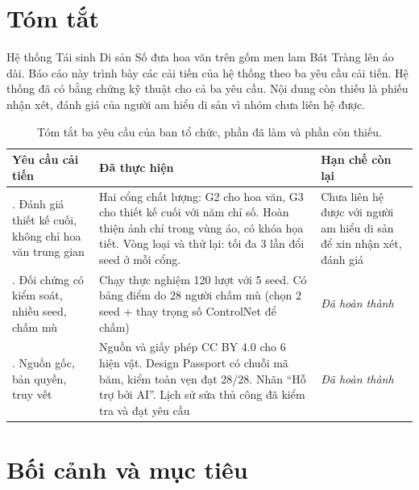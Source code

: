 \documentclass[12pt,a4paper]{report}
\begin{document}
\chapter*{Tóm tắt}

Hệ thống Tái sinh Di sản Số đưa hoa văn trên gốm men lam Bát Tràng lên áo dài. Báo cáo này trình bày các cải tiến của hệ thống theo ba yêu cầu cải tiến. Hệ thống đã có bằng chứng kỹ thuật cho cả ba yêu cầu. Nội dung còn thiếu là phiếu nhận xét, đánh giá của người am hiểu di sản vì nhóm chưa liên hệ được.

\begin{table}[H]
\centering
\setlength{\tabcolsep}{4pt}
\footnotesize
\caption{Tóm tắt ba yêu cầu của ban tổ chức, phần đã làm và phần còn thiếu.}
\label{tab:tomtat}
\begin{tabularx}{\textwidth}{>{\raggedright\arraybackslash}p{3.3cm}>{\raggedright\arraybackslash}X>{\raggedright\arraybackslash}p{4.2cm}}
\toprule
\textbf{Yêu cầu cải tiến} & \textbf{Đã thực hiện} & \textbf{Hạn chế còn lại} \\
\midrule
1. Đánh giá thiết kế cuối, không chỉ hoa văn trung gian &
Hai cổng chất lượng: G2 cho hoa văn, G3 cho thiết kế cuối với năm chỉ số. Hoàn thiện ảnh chỉ trong vùng áo, có khóa họa tiết. Vòng loại và thử lại: tối đa 3 lần đổi seed ở mỗi cổng. &
Chưa liên hệ được với người am hiểu di sản để xin nhận xét, đánh giá \\
\addlinespace
2. Đối chứng có kiểm soát, nhiều seed, chấm mù &
Chạy thực nghiệm 120 lượt với 5 seed. Có bảng điểm do 28 người chấm mù (chọn 2 seed + thay trọng số ControlNet để chấm) &
\textit{Đã hoàn thành} \\
\addlinespace
3. Nguồn gốc, bản quyền, truy vết &
Nguồn và giấy phép CC BY 4.0 cho 6 hiện vật. Design Passport có chuỗi mã băm, kiểm toàn vẹn đạt 28/28. Nhãn “Hỗ trợ bởi AI”. Lịch sử sửa thủ công đã kiểm tra và đạt yêu cầu &
\textit{Đã hoàn thành} \\
\bottomrule
\end{tabularx}
\end{table}



\chapter{Bối cảnh và mục tiêu}
\end{document}
